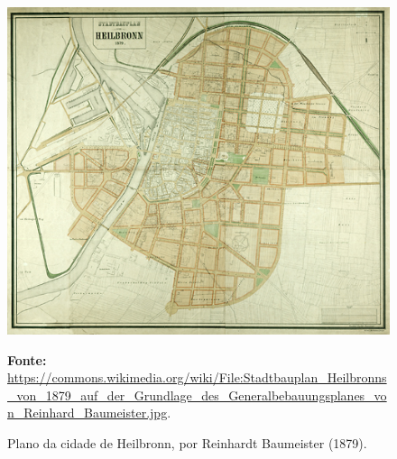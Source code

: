 \begin{a3paisagem}
\begin{figure}[!htp]
\caption{Plano da cidade de Heilbronn, por Reinhardt Baumeister (1879).}
\centering
\includegraphics[height=0.9\textheight]{2-cap1/complementos/mapas/heilbronn.jpg}{\par \footnotesize \textbf{Fonte:} \url{https://commons.wikimedia.org/wiki/File:Stadtbauplan_Heilbronns_von_1879_auf_der_Grundlage_des_Generalbebauungsplanes_von_Reinhard_Baumeister.jpg}. }
\label{fig:heilbronn1879} 
\end{figure}
\end{a3paisagem}

